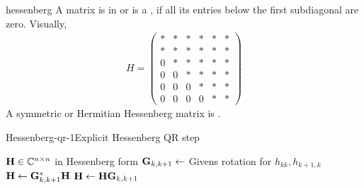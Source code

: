 \begin{Definition}{hessenberg}
  A matrix is in  or is a , if all its entries below the first subdiagonal are zero. Visually,
  \begin{gather}
    H =
    \begin{pmatrix}
      *&*&*&*&*&*\\
      *&*&*&*&*&*\\
      0&*&*&*&*&*\\
      0&0&*&*&*&*\\
      0&0&0&*&*&*\\
      0&0&0&0&*&*
    \end{pmatrix}
  \end{gather}
  A symmetric or Hermitian Hessenberg matrix is .
\end{Definition}

\begin{Algorithm*}{Hessenberg-qr-1}{Explicit Hessenberg QR step}
  \begin{algorithmic}[1]
    \Require $\mathbf H\in\mathbb C^{n\times n}$ in Hessenberg form
    \State $\mathbf G_{k,k+1} \gets$ Givens rotation for $h_{kk},h_{k+1,k}$
    \State $\mathbf H\gets \mathbf G^*_{k,k+1}\mathbf H$
    \EndFor
    \Comment{$\matH = \matr\matq$}
    \State $\mathbf H\gets \mathbf H\mathbf G_{k,k+1}$
    \EndFor
  \end{algorithmic}
\end{Algorithm*}

